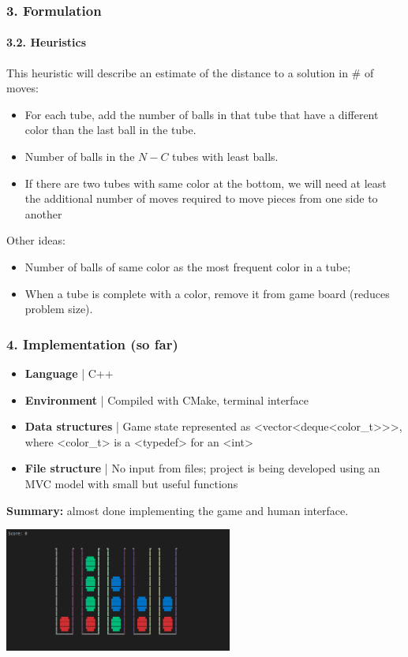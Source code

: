 \documentclass{beamer}
\def\texttt#1{<#1>}
\begin{document}
\begin{frame}
  \frametitle{3. Formulation}
  \framesubtitle{3.2. Heuristics}
  This heuristic will describe an estimate of the distance to a solution in \# of moves:
  \begin{itemize}
    \item For each tube, add the number of balls in that tube that have a different color than the last ball in the tube.
    \item Number of balls in the $N-C$ tubes with least balls.
    \item If there are two tubes with same color at the bottom, we will need at least the additional number of moves required to move pieces from one side to another
  \end{itemize}

  Other ideas:
  \begin{itemize}
    \item Number of balls of same color as the most frequent color in a tube;
    \item When a tube is complete with a color, remove it from game board (reduces problem size).
  \end{itemize}
\end{frame}

\begin{frame}
\frametitle{4. Implementation (so far)}

\begin{itemize}
  \item \textbf{Language} | C++
  \item \textbf{Environment} | Compiled with CMake, terminal interface
  \item \textbf{Data structures} | Game state represented as \texttt{vector<deque<color\_t>>}, where \texttt{color\_t} is a \texttt{typedef} for an \texttt{int}
  \item \textbf{File structure} | No input from files; project is being developed using an MVC model with small but useful functions
\end{itemize}

\textbf{Summary:} almost done implementing the game and human interface.

\begin{center}
  \includegraphics[width=75mm]{img/game-interface.png}
\end{center}

\end{frame}
\end{document}
